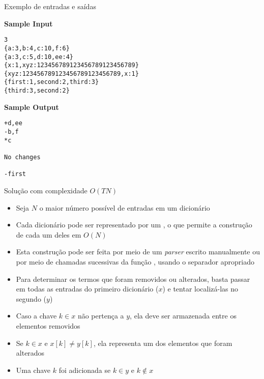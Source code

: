 \begin{frame}[fragile]{Exemplo de entradas e saídas}

\begin{minipage}[t]{0.7\textwidth}
\textbf{Sample Input}
\begin{verbatim}
3
{a:3,b:4,c:10,f:6}
{a:3,c:5,d:10,ee:4}
{x:1,xyz:123456789123456789123456789}
{xyz:123456789123456789123456789,x:1}
{first:1,second:2,third:3}
{third:3,second:2}
\end{verbatim}
\end{minipage}
\begin{minipage}[t]{0.25\textwidth}
\textbf{Sample Output}
\begin{verbatim}
+d,ee
-b,f
*c

No changes

-first
\end{verbatim}
\end{minipage}
\end{frame}

\begin{frame}[fragile]{Solução com complexidade $O(TN)$}

    \begin{itemize}
        \item Seja $N$ o maior número possível de entradas em um dicionário

        \item Cada dicionário pode ser representado por um ,
            o que permite a construção de cada um deles em $O(N)$

        \item Esta construção pode ser feita por meio de um \textit{parser} escrito manualmente
            ou por meio de chamadas sucessivas da função , usando o 
            separador apropriado

        \item Para determinar os termos que foram removidos ou alterados, basta passar em todas
            as entradas do primeiro dicionário ($x$) e tentar localizá-las no segundo ($y$)

        \item Caso a chave $k\in x$ não pertença a $y$, ela deve ser armazenada entre os elementos
            removidos

        \item Se $k\in x$ e $x[k] \neq y[k]$, ela representa um dos elementos que foram alterados

        \item Uma chave $k$ foi adicionada se $k\in y$ e $k\not\in x$
   \end{itemize}

\end{frame}

